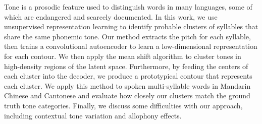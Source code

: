 Tone is a prosodic feature used to distinguish words in many languages, some of which are endangered and scarcely documented. In this work, we use unsupervised representation learning to identify probable clusters of syllables that share the same phonemic tone. Our method extracts the pitch for each syllable, then trains a convolutional autoencoder to learn a low-dimensional representation for each contour. We then apply the mean shift algorithm to cluster tones in high-density regions of the latent space. Furthermore, by feeding the centers of each cluster into the decoder, we produce a prototypical contour that represents each cluster. We apply this method to spoken multi-syllable words in Mandarin Chinese and Cantonese and evaluate how closely our clusters match the ground truth tone categories. Finally, we discuss some difficulties with our approach, including contextual tone variation and allophony effects.
